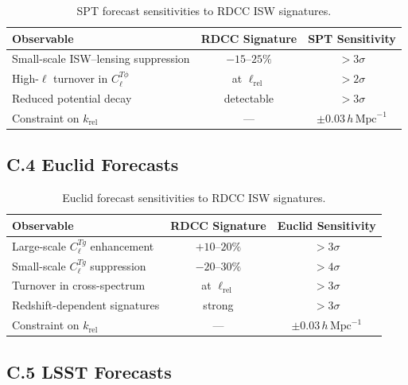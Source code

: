 \documentclass[11pt,a4paper]{article}
\begin{document}
\begin{table}[H]
\centering
\begin{tabular}{lcc}
\hline
\textbf{Observable} & \textbf{RDCC Signature} & \textbf{SPT Sensitivity} \\
\hline
Small-scale ISW--lensing suppression & $-15$--$25\%$ & $>3\sigma$ \\
High-$\ell$ turnover in $C_{\ell}^{T\phi}$ & at $\ell_{\mathrm{rel}}$ & $>2\sigma$ \\
Reduced potential decay & detectable & $>3\sigma$ \\
Constraint on $k_{\mathrm{rel}}$ & --- & $\pm 0.03\,h\,\mathrm{Mpc}^{-1}$ \\
\hline
\end{tabular}
\caption{SPT forecast sensitivities to RDCC ISW signatures.}
\end{table}

\subsection*{C.4 Euclid Forecasts}

\begin{table}[H]
\centering
\begin{tabular}{lcc}
\hline
\textbf{Observable} & \textbf{RDCC Signature} & \textbf{Euclid Sensitivity} \\
\hline
Large-scale $C_{\ell}^{Tg}$ enhancement & $+10$--$20\%$ & $>3\sigma$ \\
Small-scale $C_{\ell}^{Tg}$ suppression & $-20$--$30\%$ & $>4\sigma$ \\
Turnover in cross-spectrum & at $\ell_{\mathrm{rel}}$ & $>3\sigma$ \\
Redshift-dependent signatures & strong & $>3\sigma$ \\
Constraint on $k_{\mathrm{rel}}$ & --- & $\pm 0.03\,h\,\mathrm{Mpc}^{-1}$ \\
\hline
\end{tabular}
\caption{Euclid forecast sensitivities to RDCC ISW signatures.}
\end{table}

\subsection*{C.5 LSST Forecasts}
\end{document}
